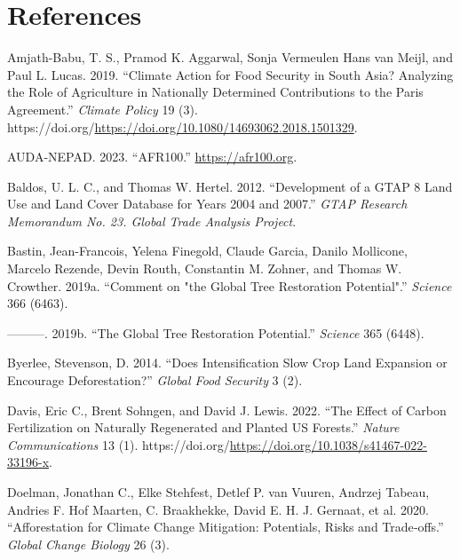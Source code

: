 \documentclass[
]{article}
\newlength{\cslhangindent}
\newlength{\cslentryspacingunit} %
\newenvironment{CSLReferences}[2] %
 {%
  \setlength{\parindent}{0pt}
  \ifodd #1
  \let\oldpar\par
  \def\par{\hangindent=\cslhangindent\oldpar}
  \fi
  \setlength{\parskip}{#2\cslentryspacingunit}
 }%
 {}
\begin{document}
\newpage

\hypertarget{references}{%
\section{References}\label{references}}

\hypertarget{refs}{}
\begin{CSLReferences}{1}{0}
\leavevmode{}%
Amjath-Babu, T. S., Pramod K. Aggarwal, Sonja Vermeulen Hans van Meijl, and Paul L. Lucas. 2019. {``Climate Action for Food Security in South Asia? Analyzing the Role of Agriculture in Nationally Determined Contributions to the Paris Agreement.''} \emph{Climate Policy} 19 (3). https://doi.org/\url{https://doi.org/10.1080/14693062.2018.1501329}.

\leavevmode{}%
AUDA-NEPAD. 2023. {``AFR100.''} \url{https://afr100.org}.

\leavevmode{}%
Baldos, U. L. C., and Thomas W. Hertel. 2012. {``Development of a GTAP 8 Land Use and Land Cover Database for Years 2004 and 2007.''} \emph{GTAP Research Memorandum No. 23. Global Trade Analysis Project}.

\leavevmode{}%
Bastin, Jean-Francois, Yelena Finegold, Claude Garcia, Danilo Mollicone, Marcelo Rezende, Devin Routh, Constantin M. Zohner, and Thomas W. Crowther. 2019a. {``Comment on "the Global Tree Restoration Potential".''} \emph{Science} 366 (6463).

\leavevmode{}%
---------. 2019b. {``The Global Tree Restoration Potential.''} \emph{Science} 365 (6448).

\leavevmode{}%
Byerlee, Stevenson, D. 2014. {``Does Intensification Slow Crop Land Expansion or Encourage Deforestation?''} \emph{Global Food Security} 3 (2).

\leavevmode{}%
Davis, Eric C., Brent Sohngen, and David J. Lewis. 2022. {``The Effect of Carbon Fertilization on Naturally Regenerated and Planted US Forests.''} \emph{Nature Communications} 13 (1). https://doi.org/\url{https://doi.org/10.1038/s41467-022-33196-x}.

\leavevmode{}%
Doelman, Jonathan C., Elke Stehfest, Detlef P. van Vuuren, Andrzej Tabeau, Andries F. Hof Maarten, C. Braakhekke, David E. H. J. Gernaat, et al. 2020. {``Afforestation for Climate Change Mitigation: Potentials, Risks and Trade‐offs.''} \emph{Global Change Biology} 26 (3).


\end{CSLReferences}
\end{document}
